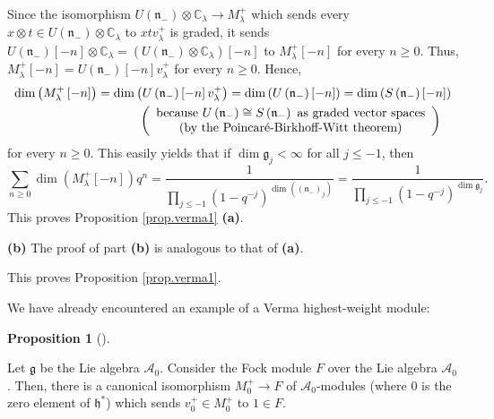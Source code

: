 \documentclass
[numbers=enddot,12pt,final,onecolumn,german,notitlepage]{scrartcl}%
\theoremstyle{definition}
\newtheorem{prop}[theo]{Proposition}
\newenvironment{proposition}[1][]
{\begin{prop}[#1]\begin{leftbar}}
{\end{leftbar}\end{prop}}
\begin{document}
Since the isomorphism $U\left(  \mathfrak{n}_{-}\right)  \otimes
\mathbb{C}_{\lambda}\rightarrow M_{\lambda}^{+}$ which sends every $x\otimes
t\in U\left(  \mathfrak{n}_{-}\right)  \otimes\mathbb{C}_{\lambda}$ to
$xtv_{\lambda}^{+}$ is graded, it sends $U\left(  \mathfrak{n}_{-}\right)
\left[  -n\right]  \otimes\mathbb{C}_{\lambda}=\left(  U\left(  \mathfrak{n}%
_{-}\right)  \otimes\mathbb{C}_{\lambda}\right)  \left[  -n\right]  $ to
$M_{\lambda}^{+}\left[  -n\right]  $ for every $n\geq0$. Thus, $M_{\lambda
}^{+}\left[  -n\right]  =U\left(  \mathfrak{n}_{-}\right)  \left[  -n\right]
v_{\lambda}^{+}$ for every $n\geq0$. Hence,
\begin{align*}
\dim\left(  M_{\lambda}^{+}\left[  -n\right]  \right)   &  =\dim\left(
U\left(  \mathfrak{n}_{-}\right)  \left[  -n\right]  v_{\lambda}^{+}\right)
=\dim\left(  U\left(  \mathfrak{n}_{-}\right)  \left[  -n\right]  \right)
=\dim\left(  S\left(  \mathfrak{n}_{-}\right)  \left[  -n\right]  \right) \\
&  \ \ \ \ \ \ \ \ \ \ \left(
\begin{array}
[c]{c}%
\text{because }U\left(  \mathfrak{n}_{-}\right)  \cong S\left(  \mathfrak{n}%
_{-}\right)  \text{ as graded vector spaces}\\
\text{(by the Poincar\'{e}-Birkhoff-Witt theorem)}%
\end{array}
\right)
\end{align*}
for every $n\geq0$. This easily yields that if $\dim\mathfrak{g}_{j}<\infty$
for all $j\leq-1$, then%
\[
\sum\limits_{n\geq0}\dim\left(  M_{\lambda}^{+}\left[  -n\right]  \right)
q^{n}=\dfrac{1}{\prod\limits_{j\leq-1}\left(  1-q^{-j}\right)  ^{\dim\left(
\left(  \mathfrak{n}_{-}\right)  _{j}\right)  }}=\dfrac{1}{\prod
\limits_{j\leq-1}\left(  1-q^{-j}\right)  ^{\dim\mathfrak{g}_{j}}}.
\]
This proves Proposition \ref{prop.verma1} \textbf{(a)}.

\textbf{(b)} The proof of part \textbf{(b)} is analogous to that of
\textbf{(a)}.

This proves Proposition \ref{prop.verma1}.

We have already encountered an example of a Verma highest-weight module:

\begin{proposition}
\label{prop.fockverma}Let $\mathfrak{g}$ be the Lie algebra $\mathcal{A}_{0}$.
Consider the Fock module $F$ over the Lie algebra $\mathcal{A}_{0}$. Then,
there is a canonical isomorphism $M_{0}^{+}\rightarrow F$ of $\mathcal{A}_{0}%
$-modules (where $0$ is the zero element of $\mathfrak{h}^{\ast}$) which sends
$v_{0}^{+}\in M_{0}^{+}$ to $1\in F$.
\end{proposition}
\end{document}
